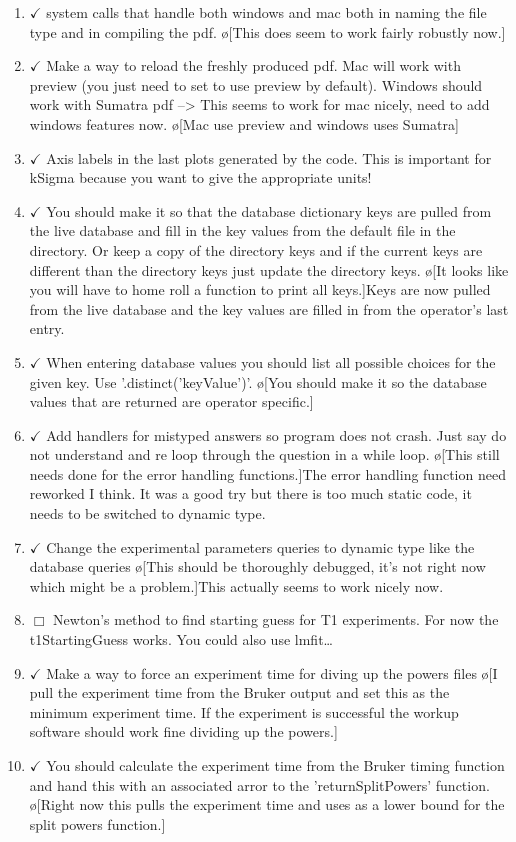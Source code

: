 \documentclass[10pt]{book}
\begin{document}
\begin{enumerate}
    \item $\checkmark$ system calls that handle both windows and mac both in naming the file type and in compiling the pdf. \o[This does seem to work fairly robustly now.]{}
    \item $\checkmark$ Make a way to reload the freshly produced pdf. Mac will work with preview (you just need to set to use preview by default). Windows should work with Sumatra pdf --> This seems to work for mac nicely, need to add windows features now. \o[Mac use preview and windows uses Sumatra]{}
    \item $\checkmark$ Axis labels in the last plots generated by the code. This is important for kSigma because you want to give the appropriate units!
    \item $\checkmark$ You should make it so that the database dictionary keys are pulled from the live database and fill in the key values from the default file in the directory. Or keep a copy of the directory keys and if the current keys are different than the directory keys just update the directory keys. \o[It looks like you will have to home roll a function to print all keys.]{Keys are now pulled from the live database and the key values are filled in from the operator's last entry.}
    \item $\checkmark$ When entering database values you should list all possible choices for the given key. Use '.distinct('keyValue')'. \o[You should make it so the database values that are returned are operator specific.]{}
    \item $\checkmark$ Add handlers for mistyped answers so program does not crash. Just say do not understand and re loop through the question in a while loop. \o[This still needs done for the error handling functions.]{The error handling function need reworked I think. It was a good try but there is too much static code, it needs to be switched to dynamic type.}
    \item $\checkmark$ Change the experimental parameters queries to dynamic type like the database queries \o[This should be thoroughly debugged, it's not right now which might be a problem.]{This actually seems to work nicely now.}
    \item $\Box$ Newton's method to find starting guess for T1 experiments. For now the t1StartingGuess works. You could also use lmfit\ldots
    \item $\checkmark$ Make a way to force an experiment time for diving up the powers files \o[I pull the experiment time from the Bruker output and set this as the minimum experiment time. If the experiment is successful the workup software should work fine dividing up the powers.]{}
    \item $\checkmark$ You should calculate the experiment time from the Bruker timing function and hand this with an associated arror to the 'returnSplitPowers' function. \o[Right now this pulls the experiment time and uses as a lower bound for the split powers function.]{}
\end{enumerate}
\end{document}
